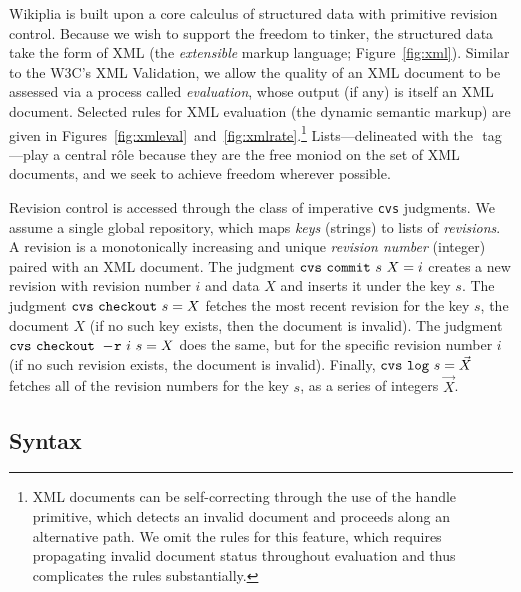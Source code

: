 \documentclass[twocolumn]{article}
\begin{document}
Wikiplia is built upon a core calculus of structured data with
primitive revision control. Because we wish to support the freedom to
tinker, the structured data take the form of XML (the {\em extensible}
markup language; Figure~\ref{fig:xml}). Similar to the W3C's XML
Validation,\z{} we allow the quality of an XML
document to be assessed via a process called {\em evaluation}, whose
output (if any) is itself an XML document. Selected rules for XML
evaluation (the dynamic semantic markup) are given in
Figures~\ref{fig:xmleval}~and~\ref{fig:xmlrate}.\z\footnote{XML
documents can be self-correcting through the use of the {\sf handle}
primitive, which detects an invalid document and proceeds along an
alternative path. We omit the rules for this feature, which requires
propagating invalid document status throughout evaluation and thus
complicates the rules substantially.} Lists---delineated with the
$\tag{list}$ tag---play a central r\^ole because they are the free
moniod on the set of XML documents, and we seek
to achieve freedom wherever possible.

Revision control is accessed through the class of imperative {\tt cvs}
judgments. We assume a single global repository, which maps {\em keys}
(strings) to lists of {\em revisions}. A revision is a monotonically
increasing and unique {\em revision number} (integer) paired with an
XML document. The judgment ${\tt cvs\ commit}\ s\ X = i$ creates a new
revision with revision number $i$ and data $X$ and inserts it under
the key $s$. The judgment ${\tt cvs\ checkout}\ s = X$ fetches the
most recent revision for the key $s$,\z{} the
document $X$ (if no such key exists, then the document is invalid).
The judgment ${\tt cvs\ checkout\ -\!r}\ i\ s = X$ does the same, but
for the specific revision number $i$ (if no such
revision exists, the document is invalid). Finally, ${\tt cvs\ log}\ s
= \vec{X}$ fetches all of the revision numbers for the key $s$, as a
series of integers $\vec{X}$.

\subsection{Syntax}
\end{document}
